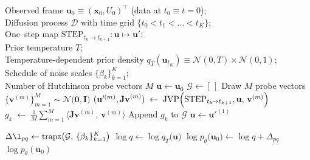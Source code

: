 \documentclass[%
aip,
 amsmath,amssymb,
reprint,%
onecolumn,
]{revtex4-1}
\begin{document}
{\begin{algorithm}[H]
  \caption{Likelihood Estimation for a Thermodynamic Map (Diffusion Model) using the Hutchinson Trace Estimator}
  \label{alg:diffusion-likelihood}
  \begin{algorithmic}[1]
    \REQUIRE Observed frame $\mathbf{u}_{0}\equiv (\mathbf{x}_0, U_0)^\top$ (data at $t_0\equiv t={0}$); \\
    Diffusion process $\mathcal{D}$ with time grid $\{t_{0}\!\!<\!\!t_{1}\!\!<\!\!\dots\!\!<\!\!t_{K}\}$; \\
    One–step map $\mathrm{STEP}_{t_{k}\!\rightarrow t_{k+1}} \colon \mathbf{u}\!\mapsto\!\mathbf{u}'$;  \\
    Prior temperature $T$;  \\
    Temperature-dependent prior density $q_T(\mathbf{u}_{t_K})\equiv \mathcal{N}(0,T) \times \mathcal{N}(0,1)$;  \\
    Schedule of noise scales $\{\beta_{k}\}_{k=1}^{K}$; \\
    Number of Hutchinson probe vectors $M$
    \STATE $\mathbf{u}\leftarrow\mathbf{u}_{0}$  
    \STATE $\mathcal{G}\leftarrow[\,]$          
      \STATE Draw $M$ probe vectors
             $\bigl\{\mathbf{v}^{(m)}\bigr\}_{m=1}^{M}
                    \sim\mathcal{N}\bigl(\mathbf{0},\mathbf{I}\bigr)$
        \STATE $(\mathbf{u}'^{(m)},\mathbf{Jv}^{(m)})\;
               \leftarrow\;
               \mathrm{JVP}\Bigl(
                 \mathrm{STEP}_{t_{k}\!\rightarrow t_{k+1}},
                 \mathbf{u},\,
                 \mathbf{v}^{(m)}
               \Bigr)$ 
      \ENDFOR
      \STATE $\displaystyle
             g_{k}\;\leftarrow\;
             \frac{1}{M}
             \sum_{m=1}^{M}
               \bigl\langle
                 \mathbf{Jv}^{(m)},\,\mathbf{v}^{(m)}
               \bigr\rangle$
      \STATE Append $g_{k}$ to $\mathcal{G}$
      \STATE $\mathbf{u}\leftarrow\mathbf{u}'^{(1)}$ 
    \ENDFOR

    \STATE $\displaystyle
           \Delta \l_{pq}
           \leftarrow
           \operatorname{trapz}\bigl(\mathcal{G},\,
                                    \{\beta_{k}\}_{k=1}^{K}\bigr)$
    \STATE $\displaystyle
           \log q
           \leftarrow
           \log q_T\bigl(\mathbf{u}\bigr)$
    \STATE $\displaystyle
           \log p_{\theta}\bigl(\mathbf{u}_{0}\bigr)
           \leftarrow
           \log q + \Delta_{pq}$
    \RETURN $\log p_{\theta}(\mathbf{u}_{0})$
  \end{algorithmic}
\end{algorithm}

}
\end{document}
